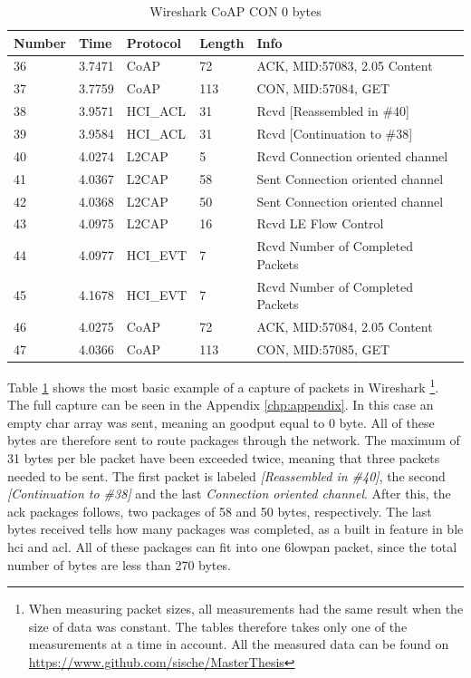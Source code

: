 \begin{table}[ht]
\centering
\caption{Wireshark CoAP CON 0 bytes}
\label{coapCON0table}
\begin{tabular}{lllll}
Number & Time   & Protocol & Length & Info                             \\ \hline
36     & 3.7471 & CoAP     & 72     & ACK, MID:57083, 2.05 Content     \\
37     & 3.7759 & CoAP     & 113    & CON, MID:57084, GET              \\
38     & 3.9571 & HCI\_ACL & 31     & Rcvd {[}Reassembled in \#40{]}   \\
39     & 3.9584 & HCI\_ACL & 31     & Rcvd {[}Continuation to \#38{]}  \\
40     & 4.0274 & L2CAP    & 5      & Rcvd Connection oriented channel \\
41     & 4.0367 & L2CAP    & 58     & Sent Connection oriented channel \\
42     & 4.0368 & L2CAP    & 50     & Sent Connection oriented channel \\
43     & 4.0975 & L2CAP    & 16     & Rcvd LE Flow Control             \\
44     & 4.0977 & HCI\_EVT & 7      & Rcvd Number of Completed Packets \\
45     & 4.1678 & HCI\_EVT & 7      & Rcvd Number of Completed Packets \\
46     & 4.0275 & CoAP     & 72     & ACK, MID:57084, 2.05 Content     \\
47     & 4.0366 & CoAP     & 113    & CON, MID:57085, GET              \\ \hline
\end{tabular}
\end{table}

Table \ref{coapCON0table} shows the most basic example of a capture of packets in Wireshark \footnote{When measuring packet sizes, all measurements had the same result when the size of data was constant. The tables therefore takes only one of the measurements at a time in account. All the measured data can be found on \url{https://www.github.com/sische/MasterThesis}}. The full capture can be seen in the Appendix \ref{chp:appendix}. In this case an empty char array was sent, meaning an goodput equal to 0 byte. All of these bytes are therefore sent to route packages through the network. The maximum of 31 bytes per \gls{ble} packet have been exceeded twice, meaning that three packets needed to be sent. The first packet is labeled \textit{[Reassembled in \#40]}, the second \textit{[Continuation to \#38]} and the last \textit{Connection oriented channel}. After this, the \gls{ack} packages follows, two packages of 58 and 50 bytes, respectively. The last bytes received tells how many packages was completed, as a built in feature in \gls{ble}  \gls{hci}  and \gls{acl}. All of these packages can fit into one \gls{6lowpan} packet, since the total number of bytes are less than 270 bytes. 

